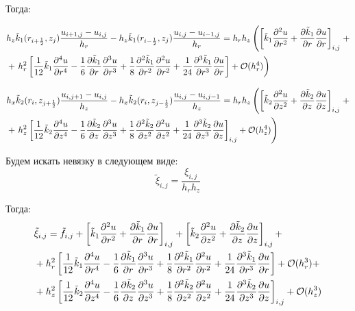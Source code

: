 Тогда:

\begin{align*}
  &h_z\Tilde{k}_1(r_{i + \frac{1}{2}}, z_j) \frac{u_{i + 1, j} - u_{i, j}}{h_r} - h_z\Tilde{k}_1 (r_{i - \frac{1}{2}}, z_j) \frac{u_{i,j} - u_{i - 1, j}}{h_r} =
  h_r h_z \left( \left[ \Tilde{k}_1 \frac{\partial^2 u}{\partial r^2} + \frac{\partial \Tilde{k}_1}{\partial r}\frac{\partial u}{\partial r} \right]_{i, j} \right. + \\
  &+ \left. h^2_r\left[ \frac{1}{12} \Tilde{k}_1 \frac{\partial^4 u}{\partial r^4} - \frac{1}{6}\frac{\partial \Tilde{k}_1}{\partial r}\frac{\partial^3 u}{\partial r^3}
  + \frac{1}{8} \frac{\partial^2 \Tilde{k}_1}{\partial r^2}\frac{\partial^2 u}{\partial r^2}
  + \frac{1}{24} \frac{\partial^3 \Tilde{k}_1}{\partial r^3}\frac{\partial u}{\partial r} \right] + \mathcal{O}(h_r^4) \right)
\end{align*}


\begin{align*}
  &h_x\Tilde{k}_2(r_i, z_{j+\frac{1}{2}}) \frac{u_{i, j + 1} - u_{i, j}}{h_z} - h_x\Tilde{k}_2(r_i, z_{j-\frac{1}{2}}) \frac{u_{i, j} - u_{i, j - 1}}{h_z} =
  h_r h_z \left(
    \left[ \Tilde{k}_2 \frac{\partial^2 u}{\partial z^2}
    + \frac{\partial \Tilde{k}_2}{\partial z} \frac{\partial u}{\partial z} \right]_{i, j}
   \right. +\\
  &+ \left. h^2_z \left[
    \frac{1}{12} \Tilde{k}_2 \frac{\partial^4 u}{\partial z^4} - \frac{1}{6} \frac{\partial \Tilde{k}_2}{\partial z} \frac{\partial^3 u}{\partial z^3}
    + \frac{1}{8} \frac{\partial^2 \Tilde{k}_2}{\partial z^2} \frac{\partial^2 u}{\partial z^2}
    + \frac{1}{24} \frac{\partial^3 \Tilde{k}_2}{\partial z^3} \frac{\partial u}{\partial z}
     \right]_{i, j} + \mathcal{O}(h_z^4) \right)
\end{align*}

Будем искать невязку в следующем виде:
\[
  \tilde{\xi}_{i, j} = \frac{\xi_{i, j}}{h_r h_z}
\]

Тогда:
\begin{align*}
  &\tilde{\xi}_{i, j} = \Tilde{f}_{i, j} + \left[ \Tilde{k}_1 \frac{\partial^2 u}{\partial r^2} + \frac{\partial \Tilde{k}_1}{\partial r}\frac{\partial u}{\partial r} \right]_{i, j} +  \left[ \Tilde{k}_2 \frac{\partial^2 u}{\partial z^2}
  + \frac{\partial \Tilde{k}_2}{\partial z} \frac{\partial u}{\partial z} \right]_{i, j} + \\
  &+h^2_r\left[ \frac{1}{12} \Tilde{k}_1 \frac{\partial^4 u}{\partial r^4} - \frac{1}{6}\frac{\partial \Tilde{k}_1}{\partial r}\frac{\partial^3 u}{\partial r^3}
  + \frac{1}{8} \frac{\partial^2 \Tilde{k}_1}{\partial r^2}\frac{\partial^2 u}{\partial r^2}
  + \frac{1}{24} \frac{\partial^3 \Tilde{k}_1}{\partial r^3}\frac{\partial u}{\partial r} \right] + \mathcal{O}(h_r^3) + \\
  &+ h^2_z \left[
    \frac{1}{12} \Tilde{k}_2 \frac{\partial^4 u}{\partial z^4} - \frac{1}{6} \frac{\partial \Tilde{k}_2}{\partial z} \frac{\partial^3 u}{\partial z^3}
    + \frac{1}{8} \frac{\partial^2 \Tilde{k}_2}{\partial z^2} \frac{\partial^2 u}{\partial z^2}
    + \frac{1}{24} \frac{\partial^3 \Tilde{k}_2}{\partial z^3} \frac{\partial u}{\partial z}
     \right]_{i, j} + \mathcal{O}(h_z^3)
\end{align*}

